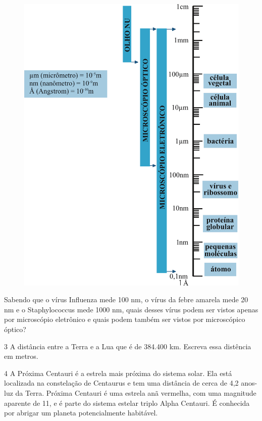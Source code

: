\begin{figure}[htpb!]
\centering
\includegraphics[width=.58\textwidth]{./ilustras-mat/modulo_14-atividade_2.png}
\end{figure}

Sabendo que o vírus Influenza mede 100 nm, o vírus da febre amarela mede 20 nm e
o Staphylococcus mede 1000 nm, quais desses vírus podem ser vistos apenas por 
microscópio eletrônico e quais podem também ser vistos por microscópico óptico?

\begin{emptybox}
\end{emptybox}

\pagebreak
\num{3} A distância entre a Terra e a Lua que é de 384.400 km. Escreva essa distência
em metros.

\begin{emptybox}
\end{emptybox}

\num{4} A Próxima Centauri é a estrela mais próxima do sistema solar. Ela está localizada
na constelação de Centaurus e tem uma distância de cerca de 4,2 anos-luz da Terra. Próxima
Centauri é uma estrela anã vermelha, com uma magnitude aparente de 11, e é parte do
sistema estelar triplo Alpha Centauri. É conhecida por abrigar um planeta potencialmente 
habitável.

